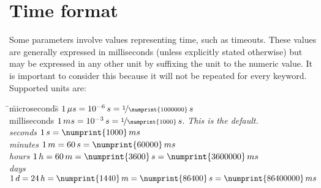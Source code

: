 
\pagebreak[4]
\section{Time format}

Some parameters involve values representing time, such as timeouts. These
values are generally expressed in milliseconds (unless explicitly stated
otherwise) but may be expressed in any other unit by suffixing the unit to the
numeric value. It is important to consider this because it will not be repeated
for every keyword. Supported units are:

\begin{tabbing}
\qquad\=\quad\= microseconds\quad\= $1\,\mu s = 10^{-6}\,s = \nicefrac{1}{\numprint{1000000}}\,s$\\
\> \> milliseconds\> $1\,ms = 10^{-3}\,s = \nicefrac{1}{\numprint{1000}}\,s$. \em{This is the default.}\\
\>  \> seconds\>  $1\,s = \numprint{1000}\,ms$\\
\>  \> minutes\>  $1\,m = 60\,s = \numprint{60000}\,ms$\\
\>  \> hours\>    $1\,h = 60\,m = \numprint{3600}\,s = \numprint{3600000}\,ms$\\
\>  \> days\>     $1\,d = 24\,h = \numprint{1440}\,m = \numprint{86400}\,s = \numprint{86400000}\,ms$\\
\end{tabbing}

